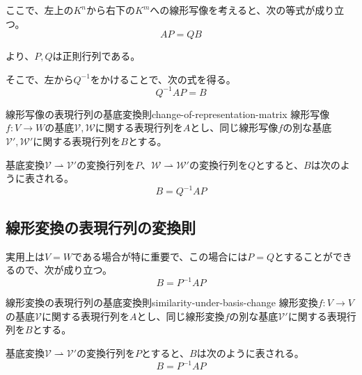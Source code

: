 \documentclass[../../../topic_linear-algebra]{subfiles}
\begin{document}
\br

ここで、左上の$K^n$から右下の$K^m$への線形写像を考えると、次の等式が成り立つ。
\begin{equation*}
  AP = QB
\end{equation*}

より、$P,Q$は正則行列である。

そこで、左から$Q^{-1}$をかけることで、次の式を得る。
\begin{equation*}
  Q^{-1}AP = B
\end{equation*}

\begin{theorem}{線形写像の表現行列の基底変換則}{change-of-representation-matrix}
  線形写像$f\colon V \to W$の基底$\mathcal{V},\mathcal{W}$に関する表現行列を$A$とし、同じ線形写像$f$の別な基底$\mathcal{V}', \mathcal{W}'$に関する表現行列を$B$とする。
  
  基底変換$\mathcal{V} \rightharpoonup \mathcal{V}'$の変換行列を$P$、$\mathcal{W} \rightharpoonup \mathcal{W}'$の変換行列を$Q$とすると、$B$は次のように表される。
  \begin{equation*}
    B = Q^{-1} A P
  \end{equation*}
\end{theorem}

\subsection{線形変換の表現行列の変換則}

実用上は$V=W$である場合が特に重要で、この場合には$P=Q$とすることができるので、次が成り立つ。
\begin{equation*}
  B = P^{-1} A P
\end{equation*}

\begin{theorem}{線形変換の表現行列の基底変換則}{similarity-under-basis-change}
  線形変換$f\colon V \to V$の基底$\mathcal{V}$に関する表現行列を$A$とし、同じ線形変換$f$の別な基底$\mathcal{V}'$に関する表現行列を$B$とする。
  
  基底変換$\mathcal{V} \rightharpoonup \mathcal{V}'$の変換行列を$P$とすると、$B$は次のように表される。
  \begin{equation*}
    B = P^{-1} A P
  \end{equation*}
\end{theorem}
\end{document}
